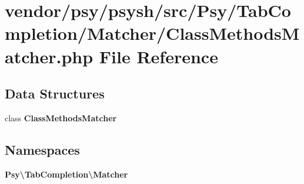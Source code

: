 \section{vendor/psy/psysh/src/\+Psy/\+Tab\+Completion/\+Matcher/\+Class\+Methods\+Matcher.php File Reference}
\label{_class_methods_matcher_8php}
\subsection*{Data Structures}
\begin{DoxyCompactItemize}
\item 
class {\bf Class\+Methods\+Matcher}
\end{DoxyCompactItemize}
\subsection*{Namespaces}
\begin{DoxyCompactItemize}
\item 
 {\bf Psy\textbackslash{}\+Tab\+Completion\textbackslash{}\+Matcher}
\end{DoxyCompactItemize}
